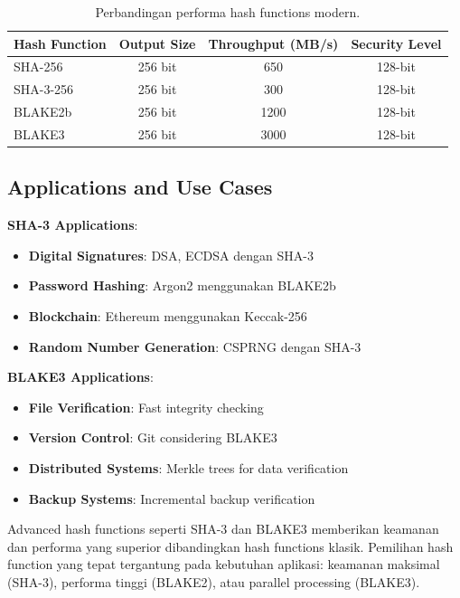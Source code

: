 \begin{table}[htbp]
  \centering
  \small
  \begin{tabular}{lccc}
    \toprule
    Hash Function & Output Size & Throughput (MB/s) & Security Level \\
    \midrule
    SHA-256 & 256 bit & 650 & 128-bit \\
    SHA-3-256 & 256 bit & 300 & 128-bit \\
    BLAKE2b & 256 bit & 1200 & 128-bit \\
    BLAKE3 & 256 bit & 3000 & 128-bit \\
    \bottomrule
  \end{tabular}
  \caption{Perbandingan performa hash functions modern.}
\end{table}

\subsection{Applications and Use Cases}

\textbf{SHA-3 Applications}:
\begin{itemize}
  \item \textbf{Digital Signatures}: DSA, ECDSA dengan SHA-3
  \item \textbf{Password Hashing}: Argon2 menggunakan BLAKE2b
  \item \textbf{Blockchain}: Ethereum menggunakan Keccak-256
  \item \textbf{Random Number Generation}: CSPRNG dengan SHA-3
\end{itemize}

\textbf{BLAKE3 Applications}:
\begin{itemize}
  \item \textbf{File Verification}: Fast integrity checking
  \item \textbf{Version Control}: Git considering BLAKE3
  \item \textbf{Distributed Systems}: Merkle trees for data verification
  \item \textbf{Backup Systems}: Incremental backup verification
\end{itemize}

\begin{catatan}
Advanced hash functions seperti SHA-3 dan BLAKE3 memberikan keamanan dan performa yang superior dibandingkan hash functions klasik. Pemilihan hash function yang tepat tergantung pada kebutuhan aplikasi: keamanan maksimal (SHA-3), performa tinggi (BLAKE2), atau parallel processing (BLAKE3).
\end{catatan}
